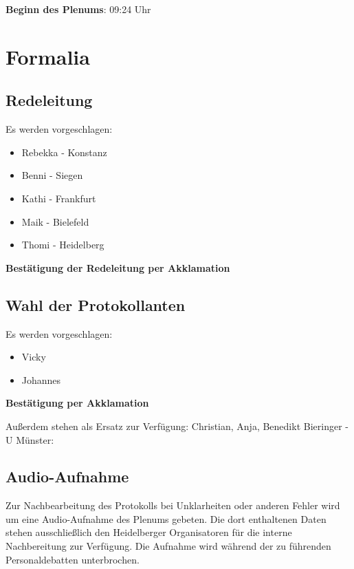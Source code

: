 
\label{chap:ende}
\textbf{Beginn des Plenums}: 09:24 Uhr

\section{Formalia}
  \subsection{Redeleitung}
    Es werden vorgeschlagen:
    \begin{itemize}
      \item Rebekka - Konstanz
      \item Benni - Siegen
      \item Kathi - Frankfurt
      \item Maik - Bielefeld
      \item Thomi - Heidelberg
    \end{itemize}

    \begin{success}{}
      \begin{center}
        \textbf{Bestätigung der Redeleitung per Akklamation}
      \end{center}
    \end{success}

  \subsection{Wahl der Protokollanten}
    Es werden vorgeschlagen:
    \begin{itemize}
      \item Vicky
      \item Johannes
    \end{itemize}

    \begin{success}{}
      \begin{center}
        \textbf{Bestätigung per Akklamation}
      \end{center}
    \end{success}
    Außerdem stehen als Ersatz zur Verfügung: Christian, Anja, Benedikt Bieringer - U Münster: 

  \subsection{Audio-Aufnahme}
    Zur Nachbearbeitung des Protokolls bei Unklarheiten oder anderen Fehler wird um eine Audio-Aufnahme des Plenums gebeten.
    Die dort enthaltenen Daten stehen ausschließlich den Heidelberger Organisatoren für die interne Nachbereitung zur Verfügung. Die Aufnahme wird während der zu führenden Personaldebatten unterbrochen.

